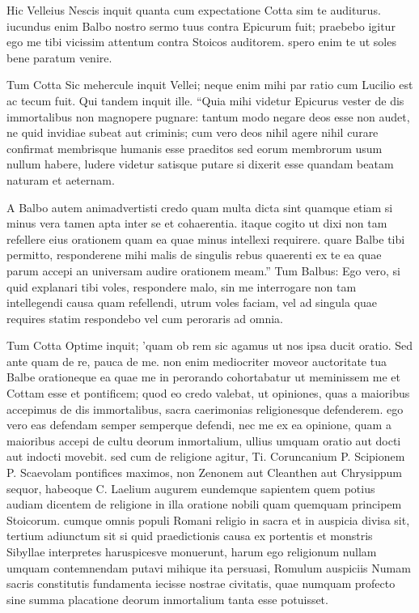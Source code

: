  Hic Velleius Nescis inquit quanta cum expectatione Cotta sim te auditurus. iucundus enim Balbo nostro sermo tuus contra Epicurum fuit; praebebo igitur ego me tibi vicissim attentum contra Stoicos auditorem. spero enim te ut soles bene paratum venire.

 Tum Cotta Sic mehercule inquit Vellei; neque enim mihi par ratio cum Lucilio est ac tecum fuit. Qui tandem inquit ille. ``Quia mihi videtur Epicurus vester de dis immortalibus non magnopere pugnare: tantum modo negare deos esse non audet, ne quid invidiae subeat aut criminis; cum vero deos nihil agere nihil curare confirmat membrisque humanis esse praeditos sed eorum membrorum usum nullum habere, ludere videtur satisque putare si dixerit esse quandam beatam naturam et aeternam.

 A Balbo autem animadvertisti credo quam multa dicta sint quamque etiam si minus vera tamen apta inter se et cohaerentia. itaque cogito ut dixi non tam refellere eius orationem quam ea quae minus intellexi requirere. quare Balbe tibi permitto, responderene mihi malis de singulis rebus quaerenti ex te ea quae parum accepi an universam audire orationem meam.'' Tum Balbus: Ego vero, si quid explanari tibi voles, respondere malo, sin me interrogare non tam intellegendi causa quam refellendi, utrum voles faciam, vel ad singula quae requires statim respondebo vel cum peroraris ad omnia.

 Tum Cotta Optime inquit; 'quam ob rem sic agamus ut nos ipsa ducit oratio. Sed ante quam de re, pauca de me. non enim mediocriter moveor auctoritate tua Balbe orationeque ea quae me in perorando cohortabatur ut meminissem me et Cottam esse et pontificem; quod eo credo valebat, ut opiniones, quas a maioribus accepimus de dis immortalibus, sacra caerimonias religionesque defenderem. ego vero eas defendam semper semperque defendi, nec me ex ea opinione, quam a maioribus accepi de cultu deorum inmortalium, ullius umquam oratio aut docti aut indocti movebit. sed cum de religione agitur, Ti. Coruncanium P. Scipionem P. Scaevolam pontifices maximos, non Zenonem aut Cleanthen aut Chrysippum sequor, habeoque C. Laelium augurem eundemque sapientem quem potius audiam dicentem de religione in illa oratione nobili quam quemquam principem Stoicorum. cumque omnis populi Romani religio in sacra et in auspicia divisa sit, tertium adiunctum sit si quid praedictionis causa ex portentis et monstris Sibyllae interpretes haruspicesve monuerunt, harum ego religionum nullam umquam contemnendam putavi mihique ita persuasi, Romulum auspiciis Numam sacris constitutis fundamenta iecisse nostrae civitatis, quae numquam profecto sine summa placatione deorum inmortalium tanta esse potuisset.


